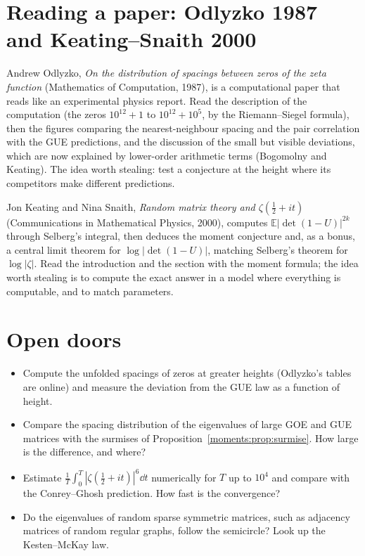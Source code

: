 \section{Reading a paper: Odlyzko 1987 and Keating--Snaith 2000}

Andrew Odlyzko, \emph{On the distribution of spacings between zeros of the zeta function} (Mathematics of Computation, 1987), is a computational paper
that reads like an experimental physics report. Read the description of the computation (the zeros $10^{12}+1$ to $10^{12}+10^5$, by the
Riemann--Siegel formula), then the figures comparing the nearest-neighbour spacing and the pair correlation with the GUE predictions, and the discussion of
the small but visible deviations, which are now explained by lower-order arithmetic terms (Bogomolny and Keating). The idea worth stealing: test a
conjecture at the height where its competitors make different predictions.

Jon Keating and Nina Snaith, \emph{Random matrix theory and $\zeta(\frac12+it)$} (Communications in Mathematical Physics, 2000), computes
$\mathbb E|\det(1-U)|^{2k}$ through Selberg's integral, then deduces the moment conjecture and, as a bonus, a central limit theorem for $\log|\det(1-U)|$,
matching Selberg's theorem for $\log|\zeta|$. Read the introduction and the section with the moment formula; the idea worth stealing is to compute the
exact answer in a model where everything is computable, and to match parameters.

\section{Open doors}

\begin{itemize}
\item Compute the unfolded spacings of zeros at greater heights (Odlyzko's tables are online) and measure the deviation from the GUE law as a function of
height.
\item Compare the spacing distribution of the eigenvalues of large GOE and GUE matrices with the surmises of Proposition~\ref{moments:prop:surmise}. How large is
the difference, and where?
\item Estimate $\frac1T\int_0^T|\zeta(\frac12+it)|^6\dd t$ numerically for $T$ up to $10^4$ and compare with the Conrey--Ghosh prediction. How fast is the
convergence?
\item Do the eigenvalues of random sparse symmetric matrices, such as adjacency matrices of random regular graphs, follow the semicircle? Look up
the Kesten--McKay law.
\end{itemize}

